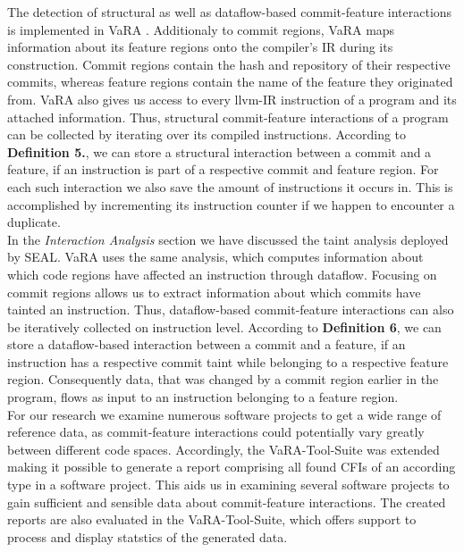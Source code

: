 The detection of structural as well as dataflow-based commit-feature interactions is implemented in VaRA \cite{VaRA2023}.
Additionaly to commit regions, VaRA maps information about its feature regions onto the compiler's IR during its construction.
Commit regions contain the hash and repository of their respective commits, whereas feature regions contain the name of the feature they originated from.
VaRA also gives us access to every llvm-IR instruction of a program and its attached information.
Thus, structural commit-feature interactions of a program can be collected by iterating over its compiled instructions.
According to \textbf{Definition 5.}, we can store a structural interaction between a commit and a feature, if an instruction is part of a respective commit and feature region.
For each such interaction we also save the amount of instructions it occurs in. 
This is accomplished by incrementing its instruction counter if we happen to encounter a duplicate. \\
In the \emph{Interaction Analysis} section we have discussed the taint analysis deployed by SEAL.
VaRA uses the same analysis, which computes information about which code regions have affected an instruction through dataflow.
Focusing on commit regions allows us to extract information about which commits have tainted an instruction.
Thus, dataflow-based commit-feature interactions can also be iteratively collected on instruction level.
According to \textbf{Definition 6}, we can store a dataflow-based interaction between a commit and a feature, if an instruction has a respective commit taint while belonging to a respective feature region.
Consequently data, that was changed by a commit region earlier in the program, flows as input to an instruction belonging to a feature region. \\
For our research we examine numerous software projects to get a wide range of reference data, as commit-feature interactions could potentially vary greatly between different code spaces.
Accordingly, the VaRA-Tool-Suite was extended making it possible to generate a report comprising all found CFIs of an according type in a software project.
This aids us in examining several software projects to gain sufficient and sensible data about commit-feature interactions.
The created reports are also evaluated in the VaRA-Tool-Suite, which offers support to process and display statstics of the generated data. \\

